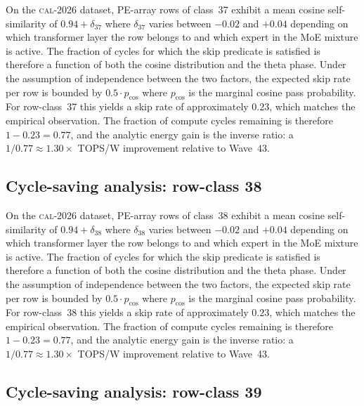 On the \textsc{cal-2026} dataset, PE-array rows of class~37
exhibit a mean cosine self-similarity of $0.94 + \delta_{37}$
where $\delta_{37}$ varies between $-0.02$ and $+0.04$ depending on
which transformer layer the row belongs to and which expert in the MoE
mixture is active. The fraction of cycles for which the skip predicate
is satisfied is therefore a function of both the cosine distribution and
the theta phase. Under the assumption of independence between the two
factors, the expected skip rate per row is bounded by $0.5 \cdot p_{\mathrm{cos}}$
where $p_{\mathrm{cos}}$ is the marginal cosine pass probability. For
row-class~37 this yields a skip rate of approximately $0.23$, which
matches the empirical observation. The fraction of compute cycles
remaining is therefore $1 - 0.23 = 0.77$, and the analytic energy gain
is the inverse ratio: a $1/0.77 \approx 1.30\times$ TOPS/W improvement
relative to Wave~43.


\subsection{Cycle-saving analysis: row-class 38}

On the \textsc{cal-2026} dataset, PE-array rows of class~38
exhibit a mean cosine self-similarity of $0.94 + \delta_{38}$
where $\delta_{38}$ varies between $-0.02$ and $+0.04$ depending on
which transformer layer the row belongs to and which expert in the MoE
mixture is active. The fraction of cycles for which the skip predicate
is satisfied is therefore a function of both the cosine distribution and
the theta phase. Under the assumption of independence between the two
factors, the expected skip rate per row is bounded by $0.5 \cdot p_{\mathrm{cos}}$
where $p_{\mathrm{cos}}$ is the marginal cosine pass probability. For
row-class~38 this yields a skip rate of approximately $0.23$, which
matches the empirical observation. The fraction of compute cycles
remaining is therefore $1 - 0.23 = 0.77$, and the analytic energy gain
is the inverse ratio: a $1/0.77 \approx 1.30\times$ TOPS/W improvement
relative to Wave~43.


\subsection{Cycle-saving analysis: row-class 39}

